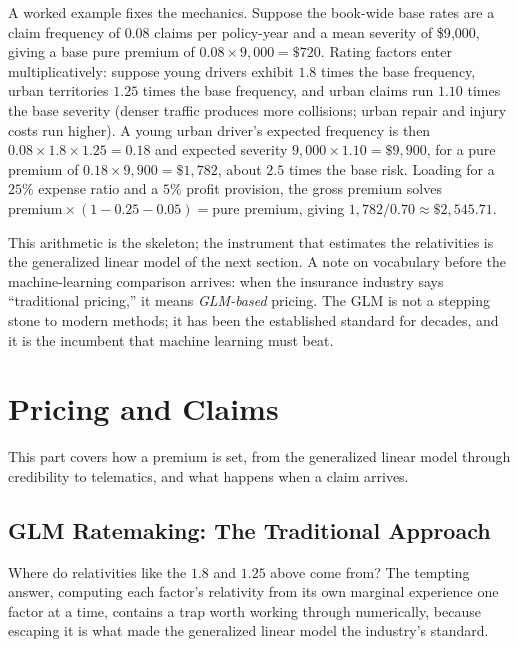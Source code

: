 \documentclass[../ai_in_finance]{subfiles}
\begin{document}
A worked example fixes the mechanics. Suppose the book-wide base rates are a claim frequency of $0.08$ claims per policy-year and a mean severity of \$9{,}000, giving a base pure premium of $0.08 \times 9{,}000 = \$720$. Rating factors enter multiplicatively: suppose young drivers exhibit $1.8$ times the base frequency, urban territories $1.25$ times the base frequency, and urban claims run $1.10$ times the base severity (denser traffic produces more collisions; urban repair and injury costs run higher). A young urban driver's expected frequency is then $0.08 \times 1.8 \times 1.25 = 0.18$ and expected severity $9{,}000 \times 1.10 = \$9{,}900$, for a pure premium of $0.18 \times 9{,}900 = \$1{,}782$, about $2.5$ times the base risk. Loading for a $25\%$ expense ratio and a $5\%$ profit provision, the gross premium solves $\text{premium} \times (1 - 0.25 - 0.05) = \text{pure premium}$, giving $1{,}782 / 0.70 \approx \$2{,}545.71$.

This arithmetic is the skeleton; the instrument that estimates the relativities is the generalized linear model of the next section. A note on vocabulary before the machine-learning comparison arrives: when the insurance industry says ``traditional pricing,'' it means \emph{GLM-based} pricing. The GLM is not a stepping stone to modern methods; it has been the established standard for decades, and it is the incumbent that machine learning must beat.

\section{Pricing and Claims}

This part covers how a premium is set, from the generalized linear model through credibility to telematics, and what happens when a claim arrives.

\subsection{GLM Ratemaking: The Traditional Approach}
\label{sec:ins-glm}

Where do relativities like the $1.8$ and $1.25$ above come from? The tempting answer, computing each factor's relativity from its own marginal experience one factor at a time, contains a trap worth working through numerically, because escaping it is what made the generalized linear model the industry's standard.
\end{document}
